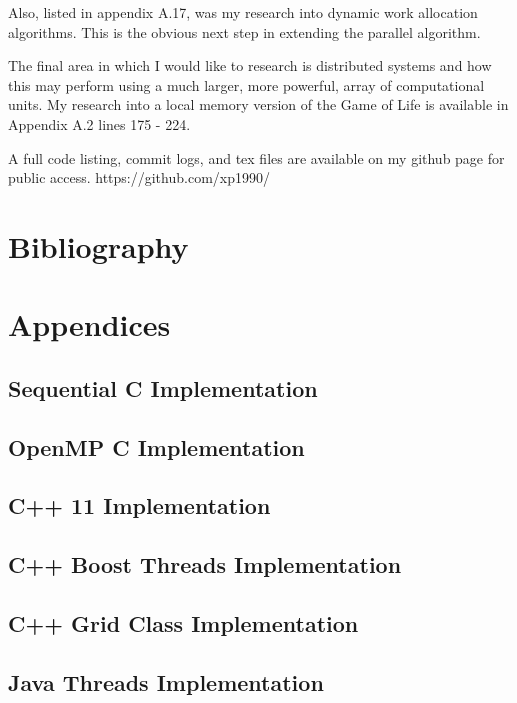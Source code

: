 \documentclass[11pt]{article} %
\begin{document}
Also, listed in appendix A.17, was my research into dynamic work allocation algorithms. This is the obvious next step in extending the parallel algorithm. 

The final area in which I would like to research is distributed systems and how this may perform using a much larger, more powerful, array of computational units. My research into a local memory version of the Game of Life is available in Appendix A.2 lines 175 - 224.

A full code listing, commit logs, and tex files are available on my github page for public access. https://github.com/xp1990/
\pagebreak
\section{Bibliography}
\nocite{*}


\pagebreak
\appendix
\pagebreak
\section{Appendices}
\subsection{Sequential C Implementation}

\pagebreak
\subsection{OpenMP C Implementation}

\pagebreak
\subsection{C++ 11 Implementation}

\pagebreak
\subsection{C++ Boost Threads Implementation}

\pagebreak
\subsection{C++ Grid Class Implementation}

\pagebreak
\subsection{Java Threads Implementation}

\pagebreak
\end{document}
